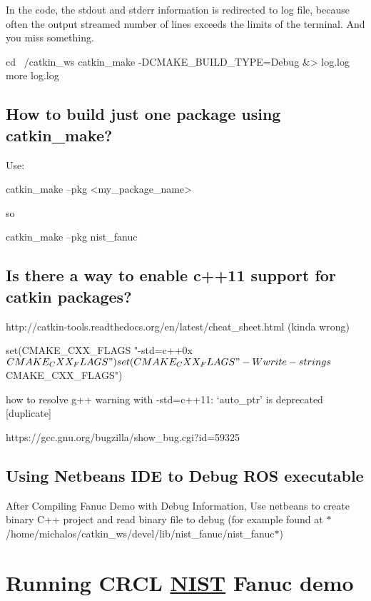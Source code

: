 In the code, the stdout and stderr information is redirected to log file, because often the output streamed number of lines exceeds the limits of the terminal. And you miss something. \begin{DoxyVerb}cd ~/catkin_ws
catkin_make -DCMAKE_BUILD_TYPE=Debug &> log.log
more log.log
\end{DoxyVerb}


\subsection*{How to build just one package using catkin\-\_\-make? }

Use\-: \begin{DoxyVerb}catkin_make --pkg <my_package_name>
\end{DoxyVerb}


so \begin{DoxyVerb}catkin_make --pkg nist_fanuc
\end{DoxyVerb}


\subsection*{Is there a way to enable c++11 support for catkin packages? }

\begin{DoxyVerb}http://catkin-tools.readthedocs.org/en/latest/cheat_sheet.html (kinda wrong)

set(CMAKE_CXX_FLAGS "-std=c++0x ${CMAKE_CXX_FLAGS}")
set(CMAKE_CXX_FLAGS "-Wwrite-strings ${CMAKE_CXX_FLAGS}")
\end{DoxyVerb}


how to resolve g++ warning with -\/std=c++11\-: ‘auto\-\_\-ptr’ is deprecated \mbox{[}duplicate\mbox{]} \begin{DoxyVerb}https://gcc.gnu.org/bugzilla/show_bug.cgi?id=59325
\end{DoxyVerb}


\subsection*{Using Netbeans I\-D\-E to Debug R\-O\-S executable }

After Compiling Fanuc Demo with Debug Information, Use netbeans to create binary C++ project and read binary file to debug (for example found at $\ast$/home/michalos/catkin\-\_\-ws/devel/lib/nist\-\_\-fanuc/nist\-\_\-fanuc$\ast$)

\section*{Running C\-R\-C\-L \hyperlink{namespaceNIST}{N\-I\-S\-T} Fanuc demo }

